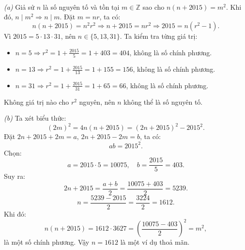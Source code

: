 \documentclass[../04-diophantine-equations.tex]{subfiles}
\begin{document}
\begin{soln}\footnotemark
	\textit{(a)} Giả sử \( n \) là số nguyên tố và tồn tại \( m \in \mathbb{Z} \) sao cho \( n(n + 2015) = m^2 \).  
	Khi đó, \( n \mid m^2 \Rightarrow n \mid m \). Đặt \( m = nr \), ta có:
	\[
		n(n + 2015) = n^2 r^2 \Rightarrow n + 2015 = nr^2 \Rightarrow 2015 = n(r^2 - 1).
	\]
	Vì \( 2015 = 5 \cdot 13 \cdot 31 \), nên \( n \in \{5, 13, 31\} \).  
	Ta kiểm tra từng giá trị:
	\begin{itemize}[topsep=0pt, partopsep=0pt, itemsep=0pt]
	    \item \( n = 5 \Rightarrow r^2 = 1 + \frac{2015}{5} = 1 + 403 = 404 \), không là số chính phương.
	    \item \( n = 13 \Rightarrow r^2 = 1 + \frac{2015}{13} = 1 + 155 = 156 \), không là số chính phương.
	    \item \( n = 31 \Rightarrow r^2 = 1 + \frac{2015}{31} = 1 + 65 = 66 \), không là số chính phương.
	\end{itemize}
	Không giá trị nào cho \( r^2 \) nguyên, nên \( n \) không thể là số nguyên tố.

	\textit{(b)} Ta xét biểu thức:
	\[
		(2m)^2 = 4n(n + 2015) = (2n + 2015)^2 - 2015^2.
	\]
	Đặt \( 2n + 2015 + 2m = a \), \( 2n + 2015 - 2m = b \), ta có:
	\[
		ab = 2015^2.
	\]
	Chọn:
	\[
		a = 2015 \cdot 5 = 10075,\quad b = \frac{2015}{5} = 403.
	\]
	Suy ra:
	\[
		2n + 2015 = \frac{a + b}{2} = \frac{10075 + 403}{2} = 5239.
	\]
	\[
		n = \frac{5239 - 2015}{2} = \frac{3224}{2} = 1612.
	\]
	Khi đó:
	\[
		n(n + 2015) = 1612 \cdot 3627 = \left( \frac{10075 - 403}{2} \right)^2 = m^2,
	\]
	là một số chính phương. Vậy \( n = 1612 \) là một ví dụ thoả mãn.
\end{soln}

\end{document}
